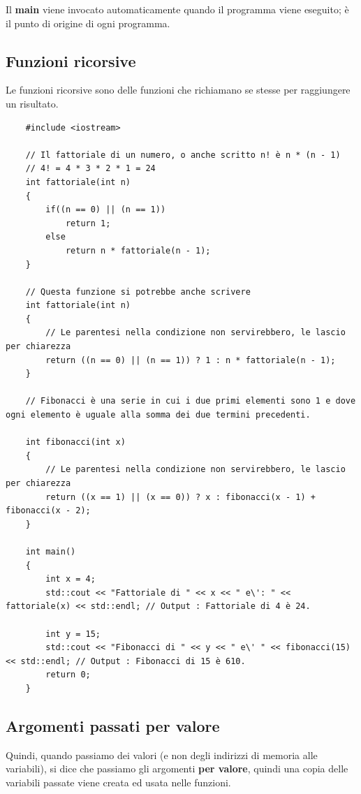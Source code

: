 \textsf{\small Il \textbf{main} viene invocato automaticamente quando il programma viene eseguito; è il punto di origine di ogni programma.} \\

\subsection{Funzioni ricorsive}

\textsf{\small Le funzioni ricorsive sono delle funzioni che richiamano se stesse per raggiungere un risultato.} \\

\begin{lstlisting}
	#include <iostream>
	
	// Il fattoriale di un numero, o anche scritto n! è n * (n - 1)
	// 4! = 4 * 3 * 2 * 1 = 24
	int fattoriale(int n)
	{
		if((n == 0) || (n == 1))
			return 1;
		else
			return n * fattoriale(n - 1);
	}

	// Questa funzione si potrebbe anche scrivere
	int fattoriale(int n)
	{
		// Le parentesi nella condizione non servirebbero, le lascio per chiarezza
		return ((n == 0) || (n == 1)) ? 1 : n * fattoriale(n - 1);
	}

	// Fibonacci è una serie in cui i due primi elementi sono 1 e dove ogni elemento è uguale alla somma dei due termini precedenti. 
	
	int fibonacci(int x)
	{
		// Le parentesi nella condizione non servirebbero, le lascio per chiarezza
		return ((x == 1) || (x == 0)) ? x : fibonacci(x - 1) + fibonacci(x - 2);
	}

	int main()
	{
		int x = 4;
		std::cout << "Fattoriale di " << x << " e\': " << fattoriale(x) << std::endl; // Output : Fattoriale di 4 è 24.
		
		int y = 15;
		std::cout << "Fibonacci di " << y << " e\' " << fibonacci(15) << std::endl; // Output : Fibonacci di 15 è 610.
		return 0;
	}
\end{lstlisting}

\subsection{Argomenti passati per valore}

\textsf{\small Quindi, quando passiamo dei valori (e non degli indirizzi di memoria alle variabili), si dice che passiamo gli argomenti \textbf{per valore}, quindi una copia delle variabili passate viene creata ed usata nelle funzioni. }

